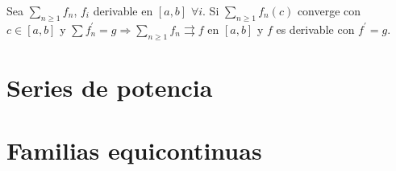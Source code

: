 \begin{corollary}
  Sea $\sum_{n \geq 1} f_n$, $f_i$ derivable en $[a, b]$ $\forall i$. Si $\sum_{n \geq 1} f_n(c)$ converge con $c \in [a, b]$ y $\sum f_n^{\prime} = g \Rightarrow \sum_{n \geq 1} f_n \rightrightarrows f$ en $[a, b]$ y $f$ es derivable con $f^{\prime} = g$. 
\end{corollary}

\section{Series de potencia}

\section{Familias equicontinuas}
